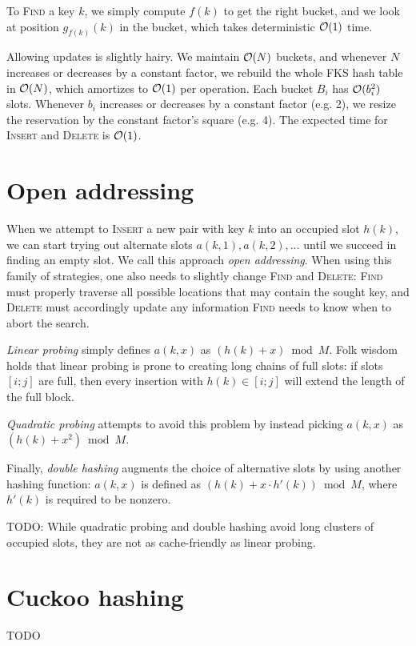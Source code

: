 To \textsc{Find} a key $k$, we simply compute $f(k)$ to get the right bucket,
and we look at position $g_{f(k)}(k)$ in the bucket, which takes deterministic
$\mathcal{O}(1)$ time.

Allowing updates is slightly hairy. We maintain $\mathcal{O}(N)$ buckets, and whenever
$N$ increases or decreases by a constant factor, we rebuild the whole FKS hash
table in $\mathcal{O}(N)$, which amortizes to $\mathcal{O}(1)$ per operation. Each bucket $B_i$
has $\mathcal{O}(b_i^2)$ slots. Whenever $b_i$ increases or decreases by a constant
factor (e.g. 2), we resize the reservation by the constant factor's square
(e.g. 4). The expected time for \textsc{Insert} and \textsc{Delete} is $\mathcal{O}(1)$.

\section{Open addressing}
When we attempt to \textsc{Insert} a new pair with key $k$ into an occupied slot
$h(k)$, we can start trying out alternate slots $a(k,1), a(k,2), \ldots$
until we succeed in finding an empty slot. We call this approach \emph{open
addressing}. When using this family of strategies, one also needs to slightly
change \textsc{Find} and \textsc{Delete}: \textsc{Find} must properly traverse
all possible locations that may contain the sought key, and \textsc{Delete}
must accordingly update any information \textsc{Find} needs to know when to
abort the search.

\emph{Linear probing} simply defines $a(k,x)$ as $(h(k)+x) \bmod M$.
Folk wisdom holds that linear probing is prone to creating long chains
of full slots: if slots $[i;j]$ are full, then every insertion with
$h(k)\in[i;j]$ will extend the length of the full block.

\emph{Quadratic probing} attempts to avoid this problem by instead picking
$a(k,x)$ as $(h(k)+x^2) \bmod M$.

Finally, \emph{double hashing} augments the choice of alternative slots by using
another hashing function: $a(k,x)$ is defined as $(h(k)+x\cdot h'(k)) \bmod M$,
where $h'(k)$ is required to be nonzero.

TODO: While quadratic probing and double hashing avoid long clusters of occupied
slots, they are not as cache-friendly as linear probing.

\section{Cuckoo hashing}
\label{sec:cuckoo}
TODO

